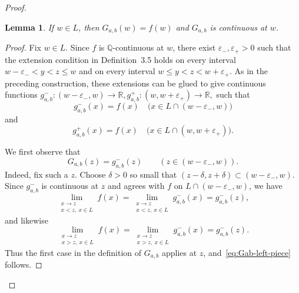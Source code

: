 \documentclass[11pt]{amsart} %
\newtheorem{lemma}[theorem]{Lemma}
\theoremstyle{definition}
\begin{document}
\begin{proof}

\begin{lemma}\label{lem:Gab-continuous-on-line}
If $w\in L$, then $G_{a,b}(w)=f(w)$ and $G_{a,b}$ is continuous
at $w$.
\end{lemma}

\begin{proof}
Fix $w\in L$. Since $f$ is $\mathbb Q$-continuous at $w$, there
exist $\varepsilon_-,\varepsilon_+>0$ such that the extension
condition in Definition~3.5 holds on every interval
$w-\varepsilon_-<y<z\leq w$ and on every interval
$w\leq y<z<w+\varepsilon_+.$
As in the preceding construction, these extensions can be glued to
give continuous functions $
g^-_{a,b}\colon (w-\varepsilon_-,w)\longrightarrow\mathbb R,
g^+_{a,b}\colon (w,w+\varepsilon_+)\longrightarrow\mathbb R,$
such that
\begin{equation} 
g^-_{a,b}(x)=f(x)
\quad
\bigl(x\in L\cap(w-\varepsilon_-,w)\bigr)
\end{equation} 
and
\begin{equation} 
g^+_{a,b}(x)=f(x)
\quad
\bigl(x\in L\cap(w,w+\varepsilon_+)\bigr).
\end{equation} 

We first observe that
\begin{equation}\label{eq:Gab-left-piece}
G_{a,b}(z)=g^-_{a,b}(z)
\qquad
(z\in(w-\varepsilon_-,w)).
\end{equation}
Indeed, fix such a $z$. Choose $\delta>0$ so small that $(z-\delta,z+\delta)\subset(w-\varepsilon_-,w).$
Since $g^-_{a,b}$ is continuous at $z$ and agrees with $f$ on
$L\cap(w-\varepsilon_-,w)$, we have
\begin{equation} 
\lim_{\substack{x\to z\\x<z,\ x\in L}} f(x)
 =
\lim_{\substack{x\to z\\x<z,\ x\in L}} g^-_{a,b}(x)
 =
g^-_{a,b}(z),
\end{equation} 
and likewise
\begin{equation} 
\lim_{\substack{x\to z\\x>z,\ x\in L}} f(x)
 =
\lim_{\substack{x\to z\\x>z,\ x\in L}} g^-_{a,b}(x)
 =
g^-_{a,b}(z).
\end{equation} 
Thus the first case in the definition of $G_{a,b}$ applies at $z$,
and~\eqref{eq:Gab-left-piece} follows.


\end{proof}
\end{proof}
\end{document}
